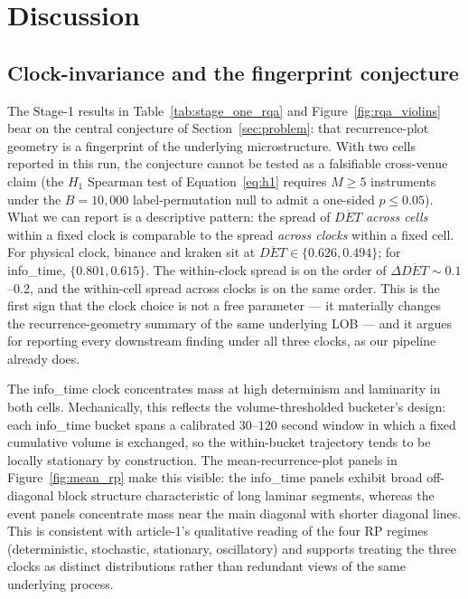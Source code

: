 \section{Discussion}
\label{sec:discussion}

\subsection*{Clock-invariance and the fingerprint conjecture}
The Stage-1 results in Table~\ref{tab:stage_one_rqa} and
Figure~\ref{fig:rqa_violins} bear on the central conjecture of
Section~\ref{sec:problem}: that recurrence-plot geometry is a
fingerprint of the underlying microstructure. With two cells reported
in this run, the conjecture cannot be tested as a falsifiable
cross-venue claim (the $H_1$ Spearman test of
Equation~\ref{eq:h1} requires $M \geq 5$ instruments under the
$B = 10{,}000$ label-permutation null to admit a one-sided
$p \leq 0.05$). What we can report is a descriptive pattern: the
spread of $\overline{DET}$ \emph{across cells} within a fixed clock
is comparable to the spread \emph{across clocks} within a fixed cell.
For physical clock, binance and kraken sit at $\overline{DET} \in
\{0.626, 0.494\}$; for info\_time, $\{0.801, 0.615\}$. The
within-clock spread is on the order of $\Delta \overline{DET} \sim
0.1$--$0.2$, and the within-cell spread across clocks is on the same
order. This is the first sign that the clock choice is not a free
parameter --- it materially changes the recurrence-geometry summary
of the same underlying LOB --- and it argues for reporting every
downstream finding under all three clocks, as our pipeline already
does.

The info\_time clock concentrates mass at high determinism and
laminarity in both cells. Mechanically, this reflects the
volume-thresholded bucketer's design: each info\_time bucket spans a
calibrated $30$--$120$ second window in which a fixed cumulative
volume is exchanged, so the within-bucket trajectory tends to be
locally stationary by construction. The mean-recurrence-plot panels
in Figure~\ref{fig:mean_rp} make this visible: the info\_time panels
exhibit broad off-diagonal block structure characteristic of long
laminar segments, whereas the event panels concentrate mass near the
main diagonal with shorter diagonal lines. This is consistent with
article-1's qualitative reading of the four RP regimes
(deterministic, stochastic, stationary, oscillatory) and supports
treating the three clocks as distinct distributions rather than
redundant views of the same underlying process.

